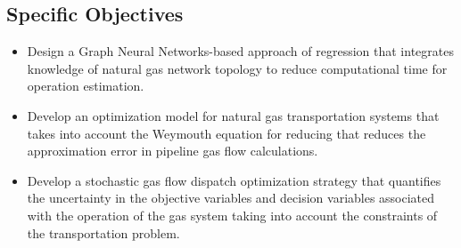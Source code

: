 \subsection{Specific Objectives}
\begin{itemize}

\item Design a Graph Neural Networks-based approach of regression that integrates knowledge of natural gas network topology to reduce computational time for operation estimation.

\item Develop an optimization model for natural gas transportation systems that takes into account the Weymouth equation for reducing that reduces the approximation error in pipeline gas flow calculations.

\item Develop a stochastic gas flow dispatch optimization strategy that quantifies the uncertainty in the objective variables and decision variables associated with the operation of the gas system taking into account the constraints of the transportation problem.

\end{itemize}













	
	
     
	





  
